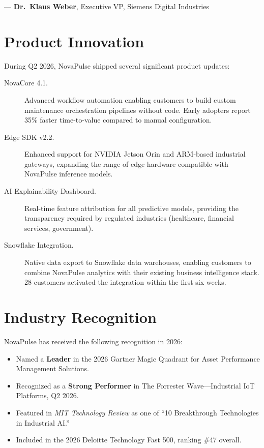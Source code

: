 \documentclass[
    language=english,
    doctype=press-release,
    institution=none,
]{../../omnilatex}
\begin{document}
\vspace{0.5em}
\noindent--- \textbf{Dr.\ Klaus Weber}, Executive VP, Siemens Digital Industries

\section*{Product Innovation}

During Q2 2026, NovaPulse shipped several significant product updates:

\begin{description}
    \item[NovaCore 4.1.] Advanced workflow automation enabling customers to
        build custom maintenance orchestration pipelines without code. Early
        adopters report 35\% faster time-to-value compared to manual
        configuration.
    \item[Edge SDK v2.2.] Enhanced support for NVIDIA Jetson Orin and
        ARM-based industrial gateways, expanding the range of edge hardware
        compatible with NovaPulse inference models.
    \item[AI Explainability Dashboard.] Real-time feature attribution for
        all predictive models, providing the transparency required by
        regulated industries (healthcare, financial services, government).
    \item[Snowflake Integration.] Native data export to Snowflake data
        warehouses, enabling customers to combine NovaPulse analytics with
        their existing business intelligence stack. 28 customers activated
        the integration within the first six weeks.
\end{description}

\section*{Industry Recognition}

NovaPulse has received the following recognition in 2026:

\begin{itemize}
    \item Named a \textbf{Leader} in the 2026 Gartner Magic Quadrant for
          Asset Performance Management Solutions.
    \item Recognized as a \textbf{Strong Performer} in The Forrester
          Wave---Industrial IoT Platforms, Q2 2026.
    \item Featured in \textit{MIT Technology Review} as one of ``10
          Breakthrough Technologies in Industrial AI.''
    \item Included in the 2026 Deloitte Technology Fast 500, ranking
          \#47 overall.
\end{itemize}
\end{document}
